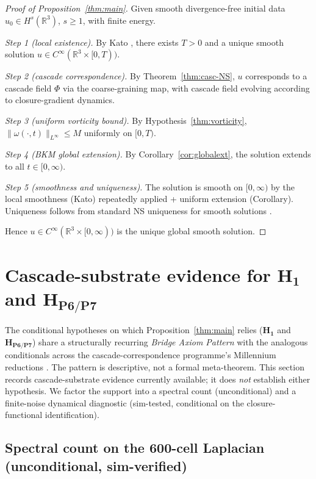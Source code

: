 \documentclass[11pt, a4paper]{amsart}
\theoremstyle{definition}
\newcommand{\R}{\mathbb{R}}
\begin{document}
\begin{proof}[Proof of Proposition~\ref{thm:main}]
Given smooth divergence-free initial data $u_0 \in H^s(\R^3)$, $s \geq 1$,
with finite energy.

\emph{Step 1 (local existence).} By Kato \cite{Kato}, there exists
$T > 0$ and a unique smooth solution $u \in C^\infty(\R^3 \times [0, T))$.

\emph{Step 2 (cascade correspondence).} By Theorem~\ref{thm:casc-NS},
$u$ corresponds to a cascade field $\Phi$ via the coarse-graining
map, with cascade field evolving according to closure-gradient dynamics.

\emph{Step 3 (uniform vorticity bound).} By Hypothesis~\ref{thm:vorticity},
$\|\omega(\cdot, t)\|_{L^\infty} \leq M$ uniformly on $[0, T)$.

\emph{Step 4 (BKM global extension).} By Corollary~\ref{cor:globalext},
the solution extends to all $t \in [0, \infty)$.

\emph{Step 5 (smoothness and uniqueness).} The solution is smooth on
$[0, \infty)$ by the local smoothness (Kato) repeatedly applied + uniform
extension (Corollary). Uniqueness follows from standard NS uniqueness
for smooth solutions \cite{KatoUniqueness}.

Hence $u \in C^\infty(\R^3 \times [0, \infty))$ is the unique global
smooth solution.
\end{proof}

\section{Cascade-substrate evidence for $\mathbf{H_1}$ and $\mathbf{H_{P6/P7}}$}\label{sec:attractor_support}

The conditional hypotheses on which Proposition~\ref{thm:main} relies
($\mathbf{H_1}$ and $\mathbf{H_{P6/P7}}$) share a structurally
recurring \emph{Bridge Axiom Pattern} with the analogous
conditionals across the cascade-correspondence programme's
Millennium reductions \cite{ConvergenceWithSmart, CascadeRHformal}.
The pattern is descriptive, not a formal meta-theorem.  This
section records cascade-substrate evidence currently available;
it does \emph{not} establish either hypothesis.  We factor the
support into a spectral count (unconditional) and a finite-noise
dynamical diagnostic (sim-tested, conditional on the closure-
functional identification).

\subsection{Spectral count on the 600-cell Laplacian (unconditional, sim-verified)}
\end{document}
